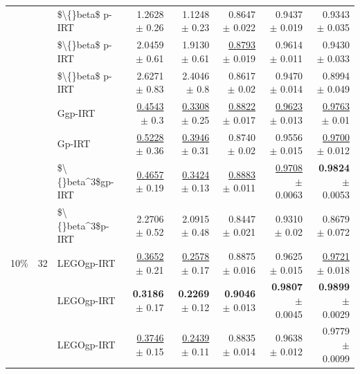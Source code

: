 \begin{longtable}{llp{}rrrrr}
 &  & \$\textbackslash\{\}beta\$ p-IRT & 1.2628 {\scriptsize $\pm$ 0.26} & 1.1248 {\scriptsize $\pm$ 0.23} & 0.8647 {\scriptsize $\pm$ 0.022} & 0.9437 {\scriptsize $\pm$ 0.019} & 0.9343 {\scriptsize $\pm$ 0.035} \\
 &  & \$\textbackslash\{\}beta\$ p-IRT & 2.0459 {\scriptsize $\pm$ 0.61} & 1.9130 {\scriptsize $\pm$ 0.61} & \underline{0.8793} {\scriptsize $\pm$ 0.019} & 0.9614 {\scriptsize $\pm$ 0.011} & 0.9430 {\scriptsize $\pm$ 0.033} \\
 &  & \$\textbackslash\{\}beta\$ p-IRT & 2.6271 {\scriptsize $\pm$ 0.83} & 2.4046 {\scriptsize $\pm$ 0.8} & 0.8617 {\scriptsize $\pm$ 0.02} & 0.9470 {\scriptsize $\pm$ 0.014} & 0.8994 {\scriptsize $\pm$ 0.049} \\
 &  & Ggp-IRT & \underline{0.4543} {\scriptsize $\pm$ 0.3} & \underline{0.3308} {\scriptsize $\pm$ 0.25} & \underline{0.8822} {\scriptsize $\pm$ 0.017} & \underline{0.9623} {\scriptsize $\pm$ 0.013} & \underline{0.9763} {\scriptsize $\pm$ 0.01} \\
 &  & Gp-IRT & \underline{0.5228} {\scriptsize $\pm$ 0.36} & \underline{0.3946} {\scriptsize $\pm$ 0.31} & 0.8740 {\scriptsize $\pm$ 0.02} & 0.9556 {\scriptsize $\pm$ 0.015} & \underline{0.9700} {\scriptsize $\pm$ 0.012} \\
 &  & \$\textbackslash\{\}beta\textasciicircum{}3\$gp-IRT & \underline{0.4657} {\scriptsize $\pm$ 0.19} & \underline{0.3424} {\scriptsize $\pm$ 0.13} & \underline{0.8883} {\scriptsize $\pm$ 0.011} & \underline{0.9708} {\scriptsize $\pm$ 0.0063} & \textbf{0.9824} {\scriptsize $\pm$ 0.0053} \\
 &  & \$\textbackslash\{\}beta\textasciicircum{}3\$p-IRT & 2.2706 {\scriptsize $\pm$ 0.52} & 2.0915 {\scriptsize $\pm$ 0.48} & 0.8447 {\scriptsize $\pm$ 0.021} & 0.9310 {\scriptsize $\pm$ 0.02} & 0.8679 {\scriptsize $\pm$ 0.072} \\
\midrule
10\% & 32 & LEGOgp-IRT & \underline{0.3652} {\scriptsize $\pm$ 0.21} & \underline{0.2578} {\scriptsize $\pm$ 0.17} & 0.8875 {\scriptsize $\pm$ 0.016} & 0.9625 {\scriptsize $\pm$ 0.015} & \underline{0.9721} {\scriptsize $\pm$ 0.018} \\
 &  & LEGOgp-IRT & \textbf{0.3186} {\scriptsize $\pm$ 0.17} & \textbf{0.2269} {\scriptsize $\pm$ 0.12} & \textbf{0.9046} {\scriptsize $\pm$ 0.013} & \textbf{0.9807} {\scriptsize $\pm$ 0.0045} & \textbf{0.9899} {\scriptsize $\pm$ 0.0029} \\
 &  & LEGOgp-IRT & \underline{0.3746} {\scriptsize $\pm$ 0.15} & \underline{0.2439} {\scriptsize $\pm$ 0.11} & 0.8835 {\scriptsize $\pm$ 0.014} & 0.9638 {\scriptsize $\pm$ 0.012} & 0.9779 {\scriptsize $\pm$ 0.0099} \\

\end{longtable}
